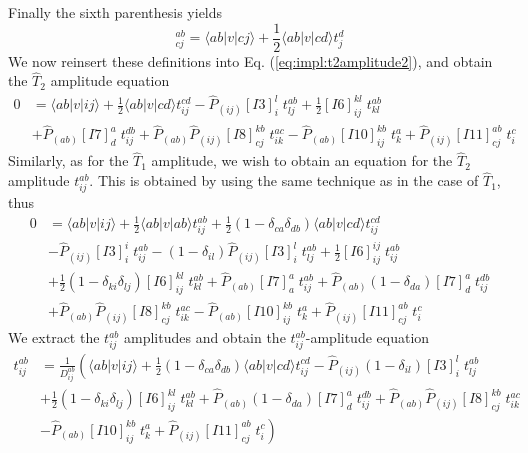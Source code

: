 %
Finally the sixth parenthesis yields
\begin{equation}
[I11]_{cj}^{ab} = \langle ab|v|cj\rangle +\frac{1}{2}\langle ab|v|cd\rangle t_j^d
\label{eq:impl:t2intermediates11}
\end{equation}
We now reinsert these definitions into Eq. (\ref{eq:impl:t2amplitude2}), and obtain the $\hat{T}_2$ amplitude equation
\begin{align}
0&=\langle ab|v|ij\rangle+\frac{1}{2}\langle ab|v|cd\rangle t_{ij}^{cd}-\hat{P}_{(ij)}[I3]_{i}^{l}\phantom{.}t_{lj}^{ab}+\frac{1}{2}[I6]_{ij}^{kl}\phantom{.}t_{kl}^{ab}\nonumber\\
&+\hat{P}_{(ab)}[I7]_{d}^{a}\phantom{.}t_{ij}^{db}+\hat{P}_{(ab)}\hat{P}_{(ij)}[I8]_{cj}^{kb}\phantom{.}t_{ik}^{ac}-\hat{P}_{(ab)}[I10]_{ij}^{kb}\phantom{.}t_{k}^{a}+\hat{P}_{(ij)}[I11]_{cj}^{ab}\phantom{.}t_{i}^{c}
\label{eq:impl:t2amplitude3}
\end{align}
Similarly, as for the $\hat{T}_1$ amplitude, we wish to obtain an equation for the $\hat{T}_2$ amplitude $t_{ij}^{ab}$. This is obtained by using the same technique as in the case of $\hat{T}_1$, thus
\begin{align}
0&=\langle ab|v|ij\rangle+\frac{1}{2}\langle ab|v|ab\rangle t_{ij}^{ab}+\frac{1}{2}(1-\delta_{ca}\delta_{db})\langle ab|v|cd\rangle t_{ij}^{cd}\nonumber\\
&-\hat{P}_{(ij)}[I3]_{i}^{i}\phantom{.}t_{ij}^{ab}-(1-\delta_{il})\hat{P}_{(ij)}[I3]_{i}^{l}\phantom{.}t_{lj}^{ab}+\frac{1}{2}[I6]_{ij}^{ij}\phantom{.}t_{ij}^{ab}\nonumber\\
&+\frac{1}{2}(1-\delta_{ki}\delta_{lj})[I6]_{ij}^{kl}\phantom{.}t_{kl}^{ab}+\hat{P}_{(ab)}[I7]_{a}^{a}\phantom{.}t_{ij}^{ab}+\hat{P}_{(ab)}(1-\delta_{da})[I7]_{d}^{a}\phantom{.}t_{ij}^{db}\nonumber\\
&+\hat{P}_{(ab)}\hat{P}_{(ij)}[I8]_{cj}^{kb}\phantom{.}t_{ik}^{ac} -\hat{P}_{(ab)}[I10]_{ij}^{kb}\phantom{.}t_{k}^{a}+\hat{P}_{(ij)}[I11]_{cj}^{ab}\phantom{.}t_{i}^{c}
\label{eq:impl:t2amplitude4}
\end{align}
We extract the $t_{ij}^{ab}$ amplitudes and obtain the $t_{ij}^{ab}$-amplitude equation
\begin{align}
t_{ij}^{ab}&=\frac{1}{D_{ij}^{ab}}\left(\langle ab|v|ij\rangle+\frac{1}{2}(1-\delta_{ca}\delta_{db})\langle ab|v|cd\rangle t_{ij}^{cd}-\hat{P}_{(ij)}(1-\delta_{il})[I3]_{i}^{l}\phantom{.}t_{lj}^{ab}\right.\nonumber\\
&\left. +\frac{1}{2}(1-\delta_{ki}\delta_{lj})[I6]_{ij}^{kl}\phantom{.}t_{kl}^{ab}+\hat{P}_{(ab)}(1-\delta_{da})[I7]_{d}^{a}\phantom{.}t_{ij}^{db}+\hat{P}_{(ab)}\hat{P}_{(ij)}[I8]_{cj}^{kb}\phantom{.}t_{ik}^{ac}\right.\nonumber\\
&\left.-\hat{P}_{(ab)}[I10]_{ij}^{kb}\phantom{.}t_{k}^{a}+\hat{P}_{(ij)}[I11]_{cj}^{ab}\phantom{.}t_{i}^{c}\right)
\label{eq:impl:t2amplitude5}
\end{align}
